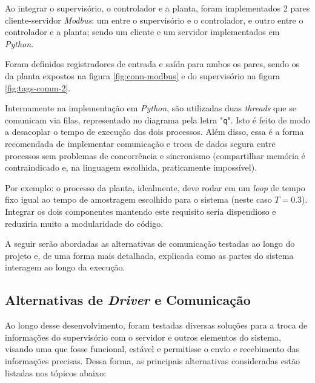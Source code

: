 \documentclass[
	article,			%
	11pt,				%
	oneside,			%
	a4paper,			%
	section=TITLE,		%
	english,			%
	brazil,				%
	sumario=tradicional
	]{abntex2}
\newcommand{\Py}{\textit{Python}}%
\newcommand{\Mb}{\textit{Modbus}}%
\begin{document}
Ao integrar o supervisório, o controlador e a planta, foram implementados 2 pares cliente-servidor \Mb: um entre o supervisório e o controlador, e outro entre o controlador e a planta; sendo um cliente e um servidor implementados em \Py.

Foram definidos registradores de entrada e saída para ambos os pares, sendo os da planta expostos na figura \ref{fig:conn-modbus} e do supervisório na figura \ref{fig:tags-comm-2}. 

Internamente na implementação em \Py, são utilizadas duas \textit{threads} que se comunicam via filas, representado no diagrama pela letra "\texttt{q}". Isto é feito de modo a desacoplar o tempo de execução dos dois processos. Além disso, essa é a forma recomendada de implementar comunicação e troca de dados segura entre processos sem problemas de concorrência e sincronismo (compartilhar memória é contraindicado e, na linguagem escolhida, praticamente impossível).

Por exemplo: o processo da planta, idealmente, deve rodar em um \textit{loop} de tempo fixo igual ao tempo de amostragem escolhido para o sistema (neste caso $T=0.3$). Integrar os dois componentes mantendo este requisito seria dispendioso e reduziria muito a modularidade do código.

A seguir serão abordadas as alternativas de comunicação testadas ao longo do projeto e, de uma forma mais detalhada, explicada como as partes do sistema interagem ao longo da execução.

\subsection{Alternativas de \textit{Driver} e Comunicação}

Ao longo desse desenvolvimento, foram testadas diversas soluções para a troca de informações do supervisório com o servidor e outros elementos do sistema, visando uma que fosse funcional, estável e permitisse o envio e recebimento das informações precisas. Dessa forma, as principais alternativas consideradas estão listadas nos tópicos abaixo:
\end{document}
